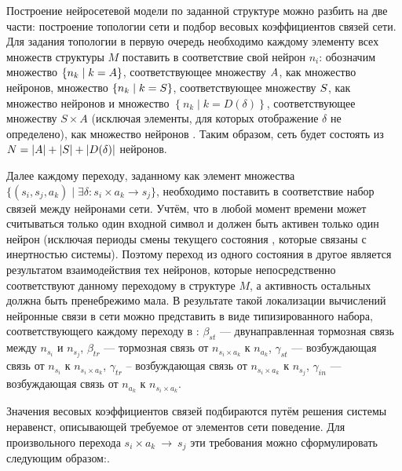 Построение нейросетевой модели по заданной структуре  можно разбить на две части: построение топологии сети и подбор весовых коэффициентов связей сети. Для задания топологии в первую очередь необходимо каждому элементу всех множеств структуры $M$ поставить в соответствие свой нейрон $n_{i}$: обозначим множество $\left\{ n_{k} \mid k = A \right\}$, соответствующее множеству $A$, как множество  нейронов, множество $\left\{ n_{k} \mid k = S \right\}$, соответствующее множеству $S$, как множество нейронов  и множество $\left\{ n_{k} \mid k = D(\delta) \right\}$, соответствующее множеству $S\!\times\!A$ (исключая элементы, для которых отображение $\delta$ не определено), как множество нейронов . Таким образом, сеть будет состоять из $N = \left|A\right| + \left|S\right| + \left|D(\delta)\right|$ нейронов.

Далее каждому переходу, заданному как элемент множества $\{ \left( s_{i}, s_{j}, a_{k} \right) \mid \exists \delta\!: s_{i}\!\times\!a_{k} \to s_{j} \}$, необходимо поставить в соответствие набор связей между нейронами сети. Учтём, что в любой момент времени может считываться только один входной символ и должен быть активен только один нейрон  (исключая периоды смены текущего состояния , которые связаны с инертностью системы). Поэтому переход из одного состояния в другое является результатом взаимодействия тех нейронов, которые непосредственно соответствуют данному переходому в структуре $M$, а активность остальных должна быть пренебрежимо мала. В результате такой локализации вычислений нейронные связи в сети можно представить в виде типизированного набора, соответствующего каждому переходу в : $\beta_{st}$ --- двунаправленная тормозная связь между $n_{s_{i}}$ и $n_{s_{j}}$, $\beta_{tr}$ --- тормозная связь от $n_{s_{i}\!\times\!a_{k}}$ к $n_{a_{k}}$, $\gamma_{st}$ --- возбуждающая связь от $n_{s_{i}}$ к $n_{s_{i}\!\times\!a_{k}}$, $\gamma_{tr}$ -- возбуждающая связь от $n_{s_{i}\!\times\!a_{k}}$ к $n_{s_{j}}$, $\gamma_{in}$ --- возбуждающая связь от $n_{a_{k}}$ к $n_{s_{i}\!\times\!a_{k}}$. 

Значения весовых коэффициентов связей подбираются путём решения системы неравенст, описывающей требуемое от элементов сети поведение. Для произвольного перехода $s_{i}\!\times\!a_{k}~\to~s_{j}$ эти требования можно сформулировать следующим образом:. 

